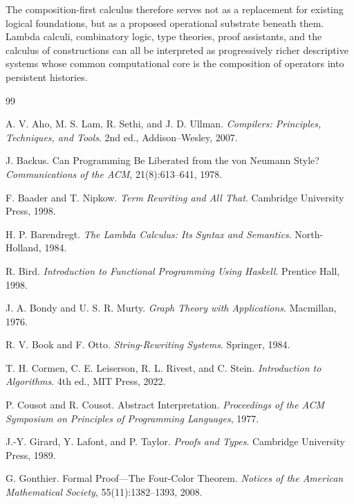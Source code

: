 \documentclass[12pt,oneside]{article}
\begin{document}
The composition-first calculus therefore serves not as a replacement for existing logical foundations, but as a proposed operational substrate beneath them. Lambda calculi, combinatory logic, type theories, proof assistants, and the calculus of constructions can all be interpreted as progressively richer descriptive systems whose common computational core is the composition of operators into persistent histories.

\newpage

\begin{thebibliography}{99}

A. V. Aho, M. S. Lam, R. Sethi, and J. D. Ullman.
\newblock \emph{Compilers: Principles, Techniques, and Tools}.
\newblock 2nd ed., Addison--Wesley, 2007.

J. Backus.
\newblock Can Programming Be Liberated from the von Neumann Style?
\newblock \emph{Communications of the ACM}, 21(8):613--641, 1978.

F. Baader and T. Nipkow.
\newblock \emph{Term Rewriting and All That}.
\newblock Cambridge University Press, 1998.

H. P. Barendregt.
\newblock \emph{The Lambda Calculus: Its Syntax and Semantics}.
\newblock North-Holland, 1984.

R. Bird.
\newblock \emph{Introduction to Functional Programming Using Haskell}.
\newblock Prentice Hall, 1998.

J. A. Bondy and U. S. R. Murty.
\newblock \emph{Graph Theory with Applications}.
\newblock Macmillan, 1976.

R. V. Book and F. Otto.
\newblock \emph{String-Rewriting Systems}.
\newblock Springer, 1984.

T. H. Cormen, C. E. Leiserson, R. L. Rivest, and C. Stein.
\newblock \emph{Introduction to Algorithms}.
\newblock 4th ed., MIT Press, 2022.

P. Cousot and R. Cousot.
\newblock Abstract Interpretation.
\newblock \emph{Proceedings of the ACM Symposium on Principles of Programming Languages}, 1977.

J.-Y. Girard, Y. Lafont, and P. Taylor.
\newblock \emph{Proofs and Types}.
\newblock Cambridge University Press, 1989.

G. Gonthier.
\newblock Formal Proof---The Four-Color Theorem.
\newblock \emph{Notices of the American Mathematical Society}, 55(11):1382--1393, 2008.


\end{thebibliography}
\end{document}

